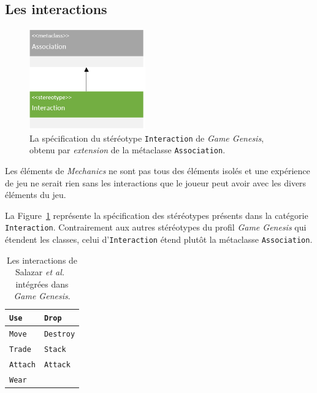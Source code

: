 \subsection{Les interactions}

\begin{figure}
    \centering
    \includegraphics[width=5cm]{10_img/chap5/metaclass_association.PNG} 
    \caption{La spécification du stéréotype \texttt{Interaction} de \emph{Game Genesis}, obtenu par \emph{extension} de la m\'etaclasse \texttt{Association}.}
    \label{fig.meta_assoc}
\end{figure}

Les éléments de \emph{Mechanics} ne sont pas tous des éléments isolés et une expérience de jeu ne serait rien sans les interactions que le joueur peut avoir avec les divers \'el\'ements du jeu.

La Figure~\ref{fig.meta_assoc} représente la spécification des stéréotypes présents dans la catégorie \texttt{Interaction}.
Contrairement aux autres stéréotypes du profil \emph{Game Genesis} qui étendent les classes, celui d'\texttt{Interaction} étend plutôt la métaclasse \texttt{Association}.

\begin{table}
\caption{Les interactions de Salazar \emph{et al.}~\cite{salazar_gdd} intégrées dans \emph{Game Genesis}.}
\begin{center}
\begin{tabular}{|l|l|}\hline
\texttt{Use} &
\texttt{Drop}
\\\hline
\texttt{Move}&
\texttt{Destroy}
\\\hline
\texttt{Trade} &
\texttt{Stack}
\\\hline
\texttt{Attach}&
\texttt{Attack}
\\\hline
\texttt{Wear}&
\\\hline
\end{tabular}
\end{center}
\label{table.interactions}
\end{table}



